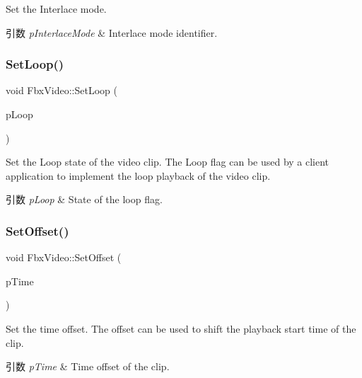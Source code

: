 Set the Interlace mode. 
\begin{DoxyParams}{引数}
{\em p\+Interlace\+Mode} & Interlace mode identifier. \\
\hline
\end{DoxyParams}
\mbox{\label{class_fbx_video_a8fbffbebcc3ef5f170003d0f18ecd7ee}} 
\subsubsection{\texorpdfstring{Set\+Loop()}{SetLoop()}}
{\footnotesize\ttfamily void Fbx\+Video\+::\+Set\+Loop (\begin{DoxyParamCaption}\item[{bool}]{p\+Loop }\end{DoxyParamCaption})}

Set the Loop state of the video clip. The Loop flag can be used by a client application to implement the loop playback of the video clip. 
\begin{DoxyParams}{引数}
{\em p\+Loop} & State of the loop flag. \\
\hline
\end{DoxyParams}
\mbox{\label{class_fbx_video_a8385942ed01c3258b7ebd7b3080962c2}} 
\subsubsection{\texorpdfstring{Set\+Offset()}{SetOffset()}}
{\footnotesize\ttfamily void Fbx\+Video\+::\+Set\+Offset (\begin{DoxyParamCaption}\item[{\hyperlink{class_fbx_time}{Fbx\+Time}}]{p\+Time }\end{DoxyParamCaption})}

Set the time offset. The offset can be used to shift the playback start time of the clip. 
\begin{DoxyParams}{引数}
{\em p\+Time} & Time offset of the clip. \\
\hline
\end{DoxyParams}
\mbox{\label{class_fbx_video_a67861ed77b1e7bfd2c1bce310f7406e6}} 
